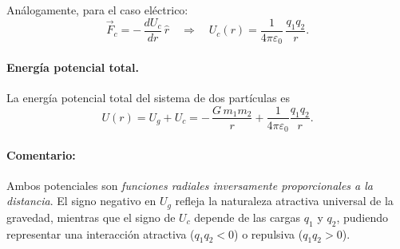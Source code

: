 Análogamente, para el caso eléctrico:
\[
\vec{F}_c = -\,\frac{dU_c}{dr}\,\hat{r}
\quad\Rightarrow\quad
\boxed{U_c(r) = \frac{1}{4\pi\varepsilon_0}\,\frac{q_1 q_2}{r}}.
\]

\paragraph{Energía potencial total.}
La energía potencial total del sistema de dos partículas es
\[
\boxed{U(r) = U_g + U_c = -\,\frac{G\,m_1 m_2}{r} + \frac{1}{4\pi\varepsilon_0}\frac{q_1 q_2}{r}}.
\]

\paragraph{Comentario:}
Ambos potenciales son \emph{funciones radiales inversamente proporcionales a la distancia}. 
El signo negativo en \(U_g\) refleja la naturaleza atractiva universal de la gravedad, 
mientras que el signo de \(U_c\) depende de las cargas \(q_1\) y \(q_2\), 
pudiendo representar una interacción atractiva (\(q_1q_2<0\)) o repulsiva (\(q_1q_2>0\)).
